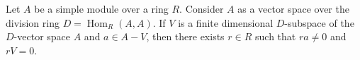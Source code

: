 Let $A$ be a simple module over a ring $R$. Consider $A$ as a vector space over the division ring $D = \operatorname{Hom}_R(A,A)$. If $V$ is a finite dimensional $D$-subspace of the $D$-vector space $A$ and $a \in A - V$, then there exists $r \in R$ such that $ra \neq 0$ and $rV = 0$.
